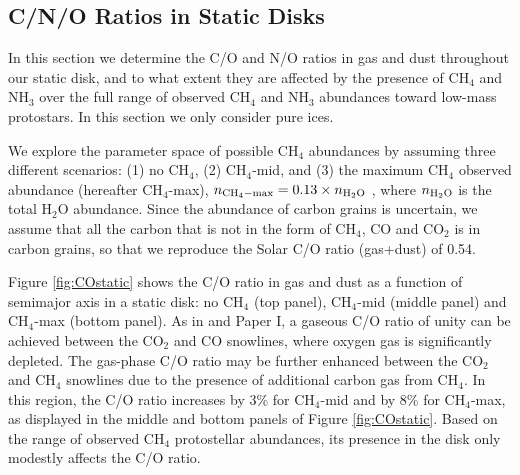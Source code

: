 \documentclass[apj]{emulateapj}
\begin{document}

\subsection{C/N/O Ratios in Static Disks}
\label{sec:static}

In this section we determine the C/O and N/O ratios in gas and dust throughout our static disk, and to what extent they are affected by the presence of CH$_4$ and NH$_3$ over the full range of observed CH$_4$ and NH$_3$ abundances toward low-mass protostars. In this section we only consider pure ices. %

We explore the parameter space of possible CH$_4$ abundances by assuming three different scenarios: (1) no CH$_4$, (2) CH$_4$-mid, and (3) the maximum CH$_4$ observed abundance (hereafter CH$_4$-max), $n_{\rm CH_4-max}=0.13 \times n_{\rm H_2O}$ \citep{oberg08}, where $n_{\rm H_2O}$ is the total H$_2$O abundance. %
Since the abundance of carbon grains is uncertain, we assume that all the carbon that is not in the form of CH$_4$, CO and CO$_2$ is in carbon grains, so that we reproduce the Solar C/O ratio (gas+dust) of 0.54.  

Figure \ref{fig:COstatic} shows the C/O ratio in gas and dust as a function of semimajor axis in a static disk: no CH$_4$ (top panel), CH$_4$-mid (middle panel) and CH$_4$-max (bottom panel). As in \citet{oberg11} and Paper I, a gaseous C/O ratio of unity can be achieved between the CO$_2$ and CO snowlines, where oxygen gas is significantly depleted. The gas-phase C/O ratio may be further enhanced between the CO$_2$ and CH$_4$ snowlines due to the presence of additional carbon gas from CH$_4$. In this region, the C/O ratio increases by 3\% for CH$_4$-mid and by 8\% for CH$_4$-max, as displayed in the middle and bottom panels of Figure \ref{fig:COstatic}. Based on the range of observed CH$_4$ protostellar abundances, its presence in the disk only modestly affects the C/O ratio. %
\end{document}
